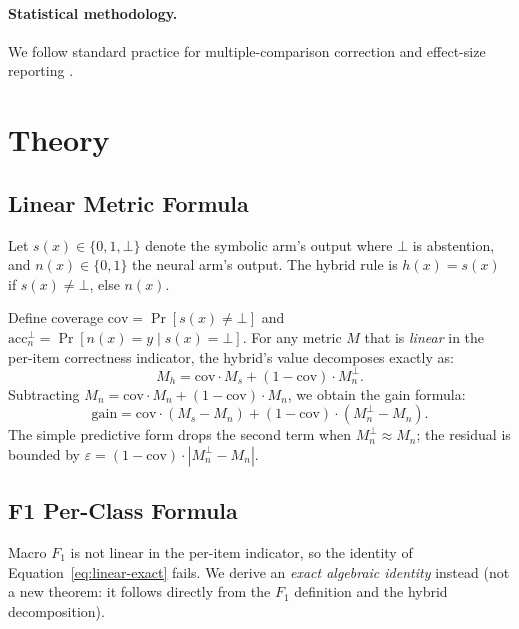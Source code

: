 \documentclass[11pt,a4paper]{article}
\begin{document}
\paragraph{Statistical methodology.}
We follow standard practice for multiple-comparison correction
\cite{benjamini1995controlling} and effect-size reporting
\cite{cohen1988statistical}.

\section{Theory}
\label{sec:theory}

\subsection{Linear Metric Formula}
\label{sec:linear}

Let $s(x) \in \{0, 1, \bot\}$ denote the symbolic arm's output where
$\bot$ is abstention, and $n(x) \in \{0, 1\}$ the neural arm's output.
The hybrid rule is $h(x) = s(x)$ if $s(x) \neq \bot$, else $n(x)$.

Define coverage $\text{cov} = \Pr[s(x) \neq \bot]$ and
$\text{acc}_n^\bot = \Pr[n(x) = y \mid s(x) = \bot]$. For any metric
$M$ that is \emph{linear} in the per-item correctness indicator,
the hybrid's value decomposes exactly as:
\begin{equation}
M_h = \text{cov} \cdot M_s + (1 - \text{cov}) \cdot M_n^\bot.
\label{eq:linear-exact}
\end{equation}
Subtracting $M_n = \text{cov} \cdot M_n + (1 - \text{cov}) \cdot M_n$,
we obtain the gain formula:
\begin{equation}
\text{gain} = \text{cov} \cdot (M_s - M_n) + (1-\text{cov}) \cdot (M_n^\bot - M_n).
\label{eq:linear-gain}
\end{equation}
The simple predictive form drops the second term when
$M_n^\bot \approx M_n$; the residual is bounded by
$\varepsilon = (1-\text{cov}) \cdot |M_n^\bot - M_n|$.


\subsection{F1 Per-Class Formula}
\label{sec:f1}

Macro $F_1$ is not linear in the per-item indicator, so the identity
of Equation~\ref{eq:linear-exact} fails. We derive an \emph{exact
algebraic identity} instead (not a new theorem: it follows directly
from the $F_1$ definition and the hybrid decomposition).
\end{document}
